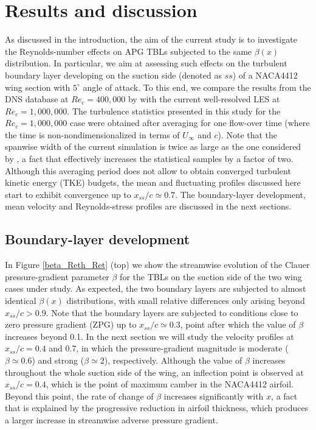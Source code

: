 \section{Results and discussion} 
  
As discussed in the introduction, the aim of the current study is to investigate the Reynolds-number effects on APG TBLs subjected to the same $\beta(x)$ distribution. In particular, we aim at assessing such effects on the turbulent boundary layer developing on the suction side (denoted as $ss$) of a NACA4412 wing section with $5^{\circ}$ angle of attack. To this end, we compare the results from the DNS database at $Re_{c}=400,000$ by \cite{hosseini_et_al} with the current well-resolved LES at $Re_{c}=1,000,000$. The turbulence statistics presented in this study for the $Re_{c}=1,000,000$ case were obtained after averaging for one flow-over time (where the time is non-nondimensionalized in terms of $U_{\infty}$ and $c$). Note that the spanwise width of the current simulation is twice as large as the one considered by \cite{hosseini_et_al}, a fact that effectively increases the statistical samples by a factor of two. Although this averaging period does not allow to obtain converged turbulent kinetic energy (TKE) budgets, the mean and fluctuating profiles discussed here start to exhibit convergence up to $x_{ss} /c \simeq 0.7$. The boundary-layer development, mean velocity and Reynolds-stress profiles are discussed in the next sections.

\subsection{Boundary-layer development}

In Figure \ref{beta_Reth_Ret} (top) we show the streamwise evolution of the Clauer pressure-gradient parameter $\beta$ for the TBLs on the suction side of the two wing cases under study. As expected, the two boundary layers are subjected to almost identical $\beta(x)$ distributions, with small relative differences only arising beyond $x_{ss}/c > 0.9$. Note that the boundary layers are subjected to conditions close to zero pressure gradient (ZPG) up to $x_{ss}/c \simeq 0.3$, point after which the value of $\beta$ increases beyond 0.1. In the next section we will study the velocity profiles at $x_{ss}/c=0.4$ and 0.7, in which the pressure-gradient magnitude is moderate ($\beta \simeq 0.6$) and strong ($\beta \simeq 2$), respectively. Although the value of $\beta$ increases throughout the whole suction side of the wing, an inflection point is observed at $x_{ss}/c=0.4$, which is the point of maximum camber in the NACA4412 airfoil. Beyond this point, the rate of change of $\beta$ increases significantly with $x$, a fact that is explained by the progressive reduction in airfoil thickness, which produces a larger increase in streamwise adverse pressure gradient.

